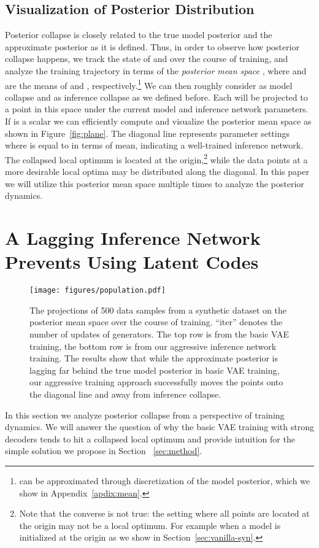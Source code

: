 \documentclass{article} \usepackage{iclr2019_conference,times}
\begin{document}
\subsection{Visualization of Posterior Distribution}
Posterior collapse is closely related to the true model posterior  and the approximate posterior  as it is defined. Thus, in order to observe how posterior collapse happens, we track the state of  and  over the course of training, and analyze the training trajectory in terms of the \textit{posterior mean space} , where  and  are the means of  and , respectively.\footnote{ can be approximated through discretization of the model posterior, which we show in Appendix~\ref{apdix:mean}.} We can then roughly consider  as model collapse and  as inference collapse as we defined before. Each  will be projected to a point in this space under the current model and inference network parameters. If  is a scalar we can efficiently compute  and visualize the posterior mean space as shown in Figure~\ref{fig:plane}. The diagonal line  represents parameter settings where  is equal to  in terms of mean, indicating a well-trained inference network. The collapsed local optimum is located at the origin,\footnote{Note that the converse is not true: the setting where all points are located at the origin may not be a local optimum. For example when a model is initialized at the origin as we show in Section~\ref{sec:vanilla-syn}.} while the data points at a more desirable local optima may be distributed along the diagonal. In this paper we will utilize this posterior mean space multiple times to analyze the posterior dynamics.






\section{A Lagging Inference Network Prevents Using Latent Codes}
\label{sec:lag}
\begin{figure}[!t]
\centering
	 \texttt{[image: figures/population.pdf]}
	 \vspace{-15pt}
	 \caption{The projections of 500 data samples from a synthetic dataset on the posterior mean space over the course of training. ``iter'' denotes the number of updates of generators. The top row is from the basic VAE training, the bottom row is from our aggressive inference network training. The results show that while the approximate posterior is lagging far behind the true model posterior in basic VAE training, our aggressive training approach successfully moves the points onto the diagonal line and away from inference collapse.}
	\label{fig:aggre-traj}
	\vspace{-10pt}
\end{figure}
In this section we analyze posterior collapse from a perspective of training dynamics. We will answer the question of why the basic VAE training with strong decoders tends to hit a collapsed local optimum and provide intuition for the simple solution we propose in Section ~\ref{sec:method}.
\end{document}
